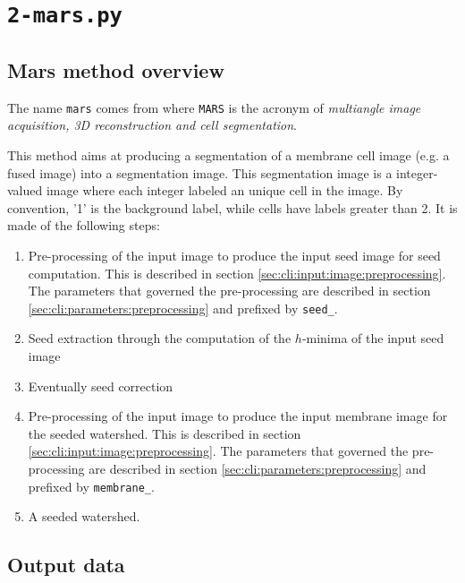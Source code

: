 \section{\texttt{2-mars.py}}
\label{sec:cli:mars}

\subsection{Mars method overview}

The name \texttt{mars} comes from \cite{fernandez:hal-00521491} where \texttt{MARS} is the acronym of \textit{multiangle image acquisition, 3D reconstruction and cell segmentation}.

This method aims at producing a segmentation of a membrane cell image (e.g.  a fused image) into a segmentation image. This segmentation image is a integer-valued image where each integer labeled an unique cell in the image. By convention, '1' is the background label, while cells have labels greater than 2. It is made of the following steps:


\begin{enumerate}
\itemsep -0.5ex
\item \label{it:mars:seed:pre:processing} Pre-processing of the input image to produce 
the input seed image for seed computation.
This is described in section \ref{sec:cli:input:image:preprocessing}. The parameters that governed the pre-processing are described in section \ref{sec:cli:parameters:preprocessing} and prefixed by \texttt{seed\_}.
\item \label{it:mars:seed:extraction} Seed extraction through the computation of the $h$-minima of the input seed image
\item \label{it:mars:seed:correction} Eventually seed correction
\item \label{it:mars:membrane:pre:processing} Pre-processing of the input image to produce 
the input membrane image for the seeded watershed.
This is described in section \ref{sec:cli:input:image:preprocessing}. The parameters that governed the pre-processing are described in section \ref{sec:cli:parameters:preprocessing} and prefixed by \texttt{membrane\_}.
\item \label{it:mars:seed:watershed} A seeded watershed.
\end{enumerate}





\subsection{Output data}

